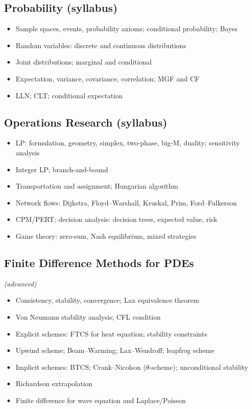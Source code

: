 \subsection{Probability (syllabus)}

\begin{itemize}
  \item Sample spaces, events, probability axioms; conditional probability; Bayes
  \item Random variables: discrete and continuous distributions
  \item Joint distributions; marginal and conditional
  \item Expectation, variance, covariance, correlation; MGF and CF
  \item LLN; CLT; conditional expectation
\end{itemize}

\subsection{Operations Research (syllabus)}

\begin{itemize}
  \item LP: formulation, geometry, simplex, two-phase, big-M, duality; sensitivity analysis
  \item Integer LP; branch-and-bound
  \item Transportation and assignment; Hungarian algorithm
  \item Network flows: Dijkstra, Floyd--Warshall, Kruskal, Prim, Ford--Fulkerson
  \item CPM/PERT; decision analysis: decision trees, expected value, risk
  \item Game theory: zero-sum, Nash equilibrium, mixed strategies
\end{itemize}

\subsection{Finite Difference Methods for PDEs} \textit{(advanced)}

\begin{itemize}
  \item Consistency, stability, convergence; Lax equivalence theorem
  \item Von Neumann stability analysis; CFL condition
  \item Explicit schemes: FTCS for heat equation; stability constraints
  \item Upwind scheme; Beam--Warming; Lax--Wendroff; leapfrog scheme
  \item Implicit schemes: BTCS; Crank--Nicolson ($\theta$-scheme); unconditional stability
  \item Richardson extrapolation
  \item Finite difference for wave equation and Laplace/Poisson
\end{itemize}


